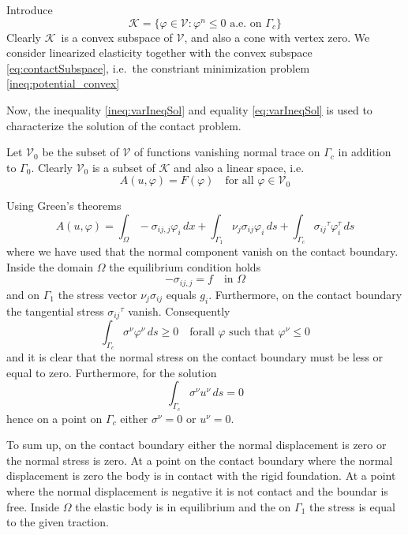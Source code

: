 \documentclass[12pt,a4paper]{article}
\numberwithin{equation}{section}
\numberwithin{table}{section}
\numberwithin{figure}{section}
\newcommand{\V}{\ensuremath{\mathcal{V}}}
\newcommand{\K}{\ensuremath{\mathcal{K}}}
\newcommand{\intO}{\int_\Omega\!\!}
\newcommand{\intG}[1][0]{\int_{\Gamma_{#1}}\!\!}
\renewcommand{\phi}{\varphi}
\newcommand{\stress}[1][]{\ensuremath{\sigma_{#1}}}
\newcommand{\sigij}{\stress[ij]}
\newcommand{\djstress}[1][]{\ensuremath{\sigma_{#1,j}}}
\newcommand{\djsigij}{\djstress[ij]}
\newcommand{\dx}{{\,dx}}
\newcommand{\ds}{{\,ds}}
\begin{document}
Introduce
\begin{equation}
  \label{eq:contactSubspace}
  \K = \{ \phi\in \V \colon \phi^n \le 0 \text{ a.e.\ on $\Gamma_c$}\}
\end{equation}
Clearly \K\ is a convex subspace of $\V$, and also a cone with vertex zero.
We consider linearized elasticity together with the convex subspace \eqref{eq:contactSubspace}, i.e.\ the constriant minimization problem \eqref{ineq:potential_convex}

Now, the inequality \eqref{ineq:varIneqSol} and equality \eqref{eq:varIneqSol} is used to characterize the solution of the contact problem.

Let $\V_0$ be the subset of $\V$ of functions vanishing normal trace on $\Gamma_c$ in addition to $\Gamma_0$. Clearly $\V_0$ is a subset of $\K$ and also a linear space, i.e.\
\begin{equation}
  A(u,\phi) = F(\phi) \quad\text{for all $\phi\in\V_0$}
\end{equation}

Using Green's theorems
\begin{equation}
  A(u,\phi) = \intO -\djsigij \phi_i \dx
  + \intG[1] \nu_j \sigij \phi_i \ds + \intG[c] \sigij^\tau \phi^\tau_i \ds
\end{equation}
where we have used that the normal component vanish on the contact boundary. Inside the domain $\Omega$ the equilibrium condition holds
\begin{equation}
  -\djsigij = f \quad\text{in $\Omega$}
\end{equation}
and on $\Gamma_1$ the stress vector $\nu_j \sigij$ equals $g_i$. Furthermore, on the contact boundary the tangential stress $\sigij^\tau$ vanish.  Consequently
\begin{equation}
  \intG[c] \sigma^\nu \phi^\nu \ds \ge 0 \quad\text{forall $\phi$ such that $\phi^\nu \le 0$}
\end{equation}
and it is clear that the normal stress on the contact boundary must be less or equal to zero. Furthermore, for the solution
\begin{equation}
  \intG[c] \sigma^\nu u^\nu \ds = 0
\end{equation}
hence on a point on $\Gamma_c$ either $\sigma^\nu = 0$ or $u^\nu = 0$.

To sum up, on the contact boundary either the normal displacement is zero or the normal stress is zero. At a point on the contact boundary where the normal displacement is zero the body is in contact with the rigid foundation. At a point where the normal displacement is negative it is not contact and the boundar is free.  Inside $\Omega$ the elastic body is in equilibrium and the on $\Gamma_1$ the stress is equal to the given traction.
\end{document}
